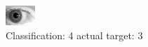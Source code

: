\begin{figure}[h!]
\begin{center}
\includegraphics[width=0.60\columnwidth]{figures/ID187_class_4_target_3.png}
\end{center}
\caption{ Classification: 4 actual target: 3}
\label{fig:ID187_class_4_target_3}
\end{figure}
